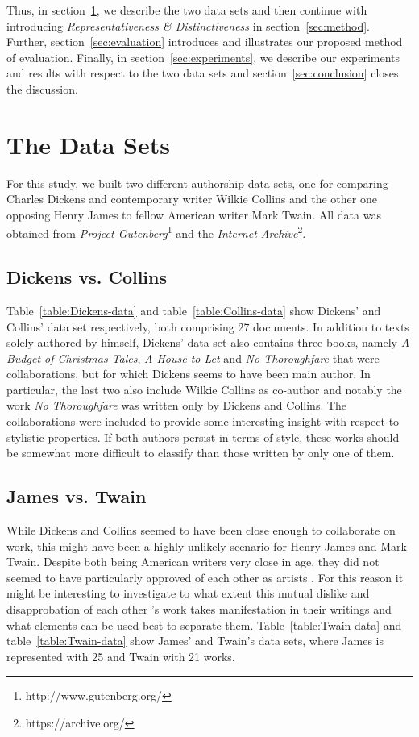 \documentclass[a4paper,10pt,twoside,fleqn]{article}
\begin{document}
Thus, in section~\ref{sec:data}, we describe the two data sets and then continue with 
introducing \emph{Representativeness \& Distinctiveness} 
in section~\ref{sec:method}. Further, section~\ref{sec:evaluation}
introduces and illustrates our proposed method of evaluation. 
Finally, in section~\ref{sec:experiments}, we describe our experiments
and results with respect to the two data sets and section~\ref{sec:conclusion}
closes the discussion. 


\section{The Data Sets} \label{sec:data}
For this study, we built two different authorship data sets, one for comparing Charles Dickens
and contemporary writer Wilkie Collins and the other one opposing Henry James 
to fellow American writer Mark Twain. 
All data was obtained from \emph{Project Gutenberg}\footnote{http://www.gutenberg.org/}
and the \emph{Internet Archive}\footnote{https://archive.org/}.

\subsection{Dickens vs. Collins}
Table~\ref{table:Dickens-data} and table~\ref{table:Collins-data} show Dickens'
and Collins' data set respectively, both comprising 27 documents.
In addition to texts solely authored by himself, Dickens' data set also contains
three books, namely \emph{A Budget of Christmas Tales}, \emph{A House to Let} and \emph{No Thoroughfare}
that were collaborations, but for which Dickens seems to have been main author.
In particular, the last two also include Wilkie Collins as co-author and notably the work
\emph{No Thoroughfare} was written only by Dickens and Collins. 
The collaborations were included to provide some interesting insight with respect to stylistic properties.
If both authors persist in terms of style, these works should be somewhat more difficult 
to classify than those written by only one of them.  
 

\subsection{James vs. Twain}
While Dickens and Collins seemed to have been close enough to collaborate on work,
this might have been a highly unlikely scenario for Henry James and Mark Twain. 
Despite both being American writers very close in age, they did not seemed to have
particularly approved of each other as artists \cite{canby1951turn}. 
For this reason it might be interesting to investigate to what extent this mutual dislike and 
disapprobation of each other 's work takes manifestation in their writings
and what elements can be used best to separate them. 
Table~\ref{table:Twain-data} and table~\ref{table:Twain-data} show 
James' and Twain's data sets, where James is represented with 25 and Twain
with 21 works. 
\end{document}

